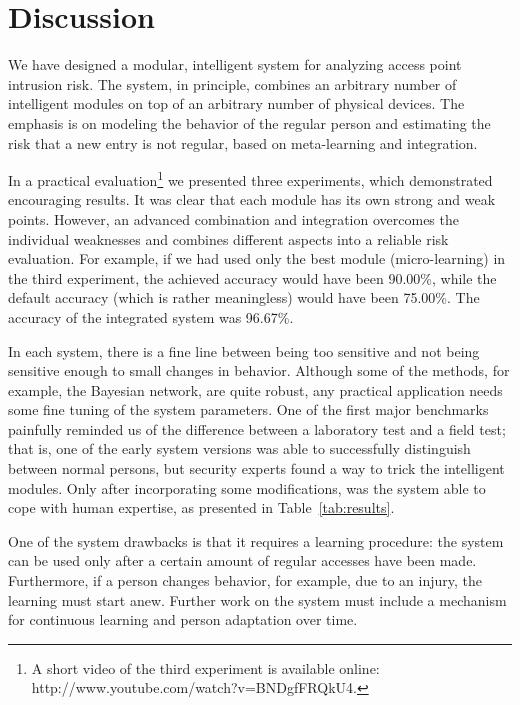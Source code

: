 %
%
\section{Discussion}
\label{sec:conclusion}

We have designed a modular, intelligent system for analyzing access point intrusion risk. The system, in principle, combines an arbitrary number of intelligent modules on  top of an arbitrary number of physical devices. The emphasis is on modeling the behavior of the regular person and estimating the risk that a new entry is not regular, based on meta-learning and integration. 

In a practical evaluation\footnote{A short video of the third experiment is available online:\\http://www.youtube.com/watch?v=BNDgfFRQkU4.} we presented three experiments, which demonstrated encouraging results.
It was clear that each module has its own strong and weak points. However, an advanced combination and integration overcomes the individual weaknesses and combines different aspects into a reliable risk evaluation. For example, if we had used only the best module (micro-learning) in the third experiment, the achieved accuracy would have been 90.00\%, while the default accuracy (which is rather meaningless) would have been 75.00\%. The accuracy of the integrated system was 96.67\%.

In each system, there is a fine line between being too sensitive and not being sensitive enough to small changes in behavior. Although some of the methods, for example, the Bayesian network, are quite robust, any practical application needs some fine tuning of the system parameters. One of the first major benchmarks painfully reminded us of the difference between a laboratory test and a field test; that is, one of the early system versions was able to successfully distinguish between normal persons, but security experts found a way to trick the intelligent modules. Only after incorporating  some modifications, was the system able to cope with human expertise, as presented in Table~\ref{tab:results}.

One of the system drawbacks is that it requires a learning procedure: the system can be used only after a certain amount of regular accesses have been made. Furthermore, if a person changes behavior, for example, due to an injury, the learning must start anew. Further work on the system must include a mechanism for continuous learning and person adaptation over time.

